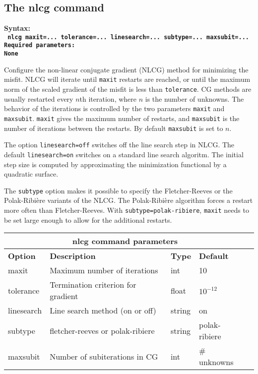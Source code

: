 \documentclass[12pt]{report}
\begin{document}
\subsection{The nlcg command}\label{sec:nlcg}
\begin{flushleft}\bf
Syntax:\\
\tt
nlcg maxit=... tolerance=... linesearch=... subtype=... maxsubit=...
\\
\bf Required parameters:\\
\rm
None
\end{flushleft}
Configure the non-linear conjugate gradient (NLCG) method for minimizing the misfit. NLCG will iterate 
until \verb+maxit+ restarts are reached, or until the maximum norm of the scaled gradient of the 
misfit is less than \verb+tolerance+. CG methods are usually restarted every $n$th iteration, 
where $n$ is the number of unknowns. The behavior of the iterations is controlled by the two 
parameters \verb+maxit+ and \verb+maxsubit+. \verb+maxit+ gives the maximum number of restarts, 
and \verb+maxsubit+ is the number of iterations between the restarts. By default \verb+maxsubit+ 
is set to $n$. 
\par
The option {\tt linesearch=off} switches off the line search step in NLCG. 
The default {\tt linesearch=on} switches on a standard line search algoritm. 
The initial step size is computed by approximating the minimization functional by
a quadratic surface.
\par
The \verb+subtype+ option makes it possible to specify the Fletcher-Reeves or the
Polak-Ribi\`ere variants of the NLCG. The Polak-Ribi\`ere algorithm forces a restart
more often than Fletcher-Reeves. With {\tt subtype=polak-ribiere}, \verb+maxit+ needs to 
be set large enough to allow for the additional restarts. 

\begin{center}
\begin{tabular}{|l|p{6cm}|l|l|l|} \hline
\multicolumn{4}{|c|}{\bf nlcg command parameters}\\ \hline
{\bf Option} & {\bf Description}          & {\bf Type} & {\bf Default} \\ \hline 
\hline
maxit       & Maximum number of iterations        & int & 10 \\ \hline
tolerance   & Termination criterion for gradient  & float & $10^{-12}$ \\ \hline
linesearch  & Line search method (on or off)  & string & on \\ \hline
subtype     & fletcher-reeves or polak-ribiere & string  & polak-ribiere \\ \hline
maxsubit    & Number of subiterations in CG & int & \# unknowns \\ \hline
\end{tabular}
\end{center}
\end{document}
